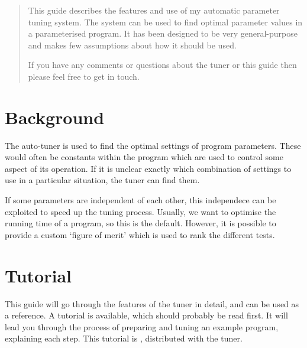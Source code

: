 \documentclass[a4paper, draft]{article}
\begin{document}
\maketitle

\begin{abstract}
This guide describes the features and use of my automatic parameter tuning 
system. The system can be used to find optimal parameter values in a 
parameterised program. It has been designed to be very general-purpose and 
makes few assumptions about how it should be used.

If you have any comments or questions about the tuner or this guide then
please feel free to get in touch.
\end{abstract}


\tableofcontents

\newpage


\section{Background}
\label{sec:intro}
The auto-tuner is used to find the optimal settings of program parameters. 
These would often be constants within the program which are used to control 
some aspect of its operation. If it is unclear exactly which combination of 
settings to use in a particular situation, the tuner can find them. 

If some 
parameters are independent of each other, this independece can be exploited 
to speed up the tuning process. Usually, we want to optimise the running time 
of a program, so this is the default. However, it is possible to provide a 
custom `figure of merit' which is used to rank the different tests.







\section{Tutorial}
\label{sec:tutorial}
This guide will go through the features of the tuner in detail, and can be 
used as a reference. A tutorial is available, which should probably be read 
first. It will lead you through the process of preparing and tuning an 
example program, explaining each step. This tutorial is 
, distributed with the tuner.
\end{document}
